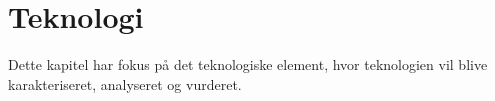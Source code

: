 \chapter{Teknologi}
Dette kapitel har fokus på det teknologiske element, hvor teknologien vil blive karakteriseret, analyseret og vurderet.









